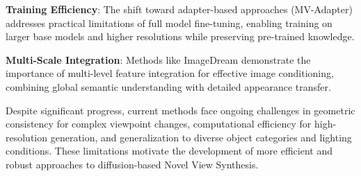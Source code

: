 \textbf{Training Efficiency}: The shift toward adapter-based approaches (MV-Adapter) addresses practical limitations of full model fine-tuning, enabling training on larger base models and higher resolutions while preserving pre-trained knowledge.

  \textbf{Multi-Scale Integration}: Methods like ImageDream demonstrate the importance of multi-level feature integration for effective image conditioning, combining global semantic understanding with detailed appearance transfer.

  Despite significant progress, current methods face ongoing challenges in geometric consistency for complex viewpoint changes, computational efficiency for high-resolution generation, and generalization to diverse object categories and lighting conditions. These limitations motivate the development of more efficient and robust approaches to diffusion-based Novel View Synthesis.